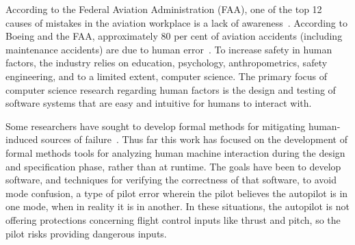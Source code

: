 According to the Federal Aviation Administration (FAA), one of the top 12 causes of mistakes in the aviation workplace is a lack of awareness~\cite{faa}. According to Boeing and the FAA, approximately 80 per cent of aviation accidents (including maintenance accidents) are due to human error~\cite{boeing,faaHF}. To increase safety in human factors, the industry relies on education, psychology, anthropometrics, safety engineering, and to a limited extent, computer science. The primary focus of computer science research regarding human factors is the design and testing of software systems that are easy and intuitive for humans to interact with. 

%
%

Some researchers have sought to develop formal methods for mitigating human-induced sources of failure~\cite{ButlerModeConfusion,Rushby_Mode_Confusion}. Thus far this work has focused on the development of formal methods tools for analyzing human machine interaction during the design and specification phase, rather than at runtime. The goals have been to develop software, and techniques for verifying the correctness of that software, to avoid mode confusion, a type of pilot error wherein the pilot believes the autopilot is in one mode, when in reality it is in another. In these situations, the autopilot is not offering protections concerning flight control inputs like thrust and pitch, so the pilot risks providing dangerous inputs.

